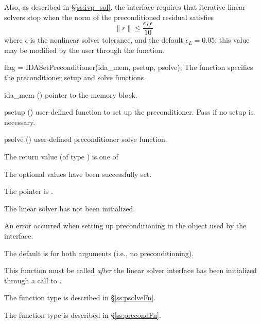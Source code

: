 {Also, as described in \S\ref{ss:ivp_sol}, the {\idals} interface
requires that iterative linear solvers stop when the norm of the
preconditioned residual satisfies
\[
  \|r\| \le \frac{\epsilon_L \epsilon}{10}
\]
where $\epsilon$ is the nonlinear solver tolerance, and the default
$\epsilon_L = 0.05$; this value may be modified by the user through
the  function.


{
  flag = IDASetPreconditioner(ida\_mem, psetup, psolve);
}
{
  The function  specifies the preconditioner
  setup and solve functions.
}
{
  \begin{args}
  \item[ida\_mem] ()
    pointer to the {\ida} memory block.
  \item[psetup] ()
    user-defined function to set up the preconditioner.  Pass  if no
    setup is necessary.
  \item[psolve] ()
    user-defined preconditioner solve function.
  \end{args}
}
{
  The return value  (of type ) is one of
  \begin{args}
  \item[\Id{IDALS\_SUCCESS}]
    The optional values have been successfully set.
  \item[\Id{IDALS\_MEM\_NULL}]
    The  pointer is .
  \item[\Id{IDALS\_LMEM\_NULL}]
    The {\idals} linear solver has not been initialized.
  \item[\Id{IDALS\_SUNLS\_FAIL}]
    An error occurred when setting up preconditioning in the
    {\sunlinsol} object used by the {\idals} interface.
  \end{args}
}
{
  The default is  for both arguments (i.e., no
  preconditioning).

  This function must be called \emph{after} the {\idals} linear solver
  interface has been initialized through a call to .

  The function type  is described in \S\ref{ss:psolveFn}.

  The function type  is described in \S\ref{ss:precondFn}.

}}
